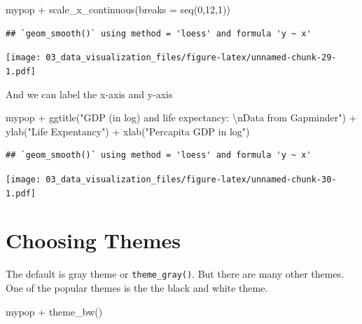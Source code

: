 \documentclass[
  10pt,
]{krantz}
\newenvironment{Shaded}{\begin{snugshade}}{\end{snugshade}}
\newcommand{\AttributeTok}[1]{\textcolor[rgb]{0.77,0.63,0.00}{#1}}
\newcommand{\DecValTok}[1]{\textcolor[rgb]{0.00,0.00,0.81}{#1}}
\newcommand{\FunctionTok}[1]{\textcolor[rgb]{0.00,0.00,0.00}{#1}}
\newcommand{\NormalTok}[1]{#1}
\newcommand{\SpecialCharTok}[1]{\textcolor[rgb]{0.00,0.00,0.00}{#1}}
\newcommand{\StringTok}[1]{\textcolor[rgb]{0.31,0.60,0.02}{#1}}
\begin{document}
\begin{Shaded}
\begin{Highlighting}[]
\NormalTok{mypop }\SpecialCharTok{+} 
  \FunctionTok{scale\_x\_continuous}\NormalTok{(}\AttributeTok{breaks =} \FunctionTok{seq}\NormalTok{(}\DecValTok{0}\NormalTok{,}\DecValTok{12}\NormalTok{,}\DecValTok{1}\NormalTok{))}
\end{Highlighting}
\end{Shaded}

\begin{verbatim}
## `geom_smooth()` using method = 'loess' and formula 'y ~ x'
\end{verbatim}

\texttt{[image: 03\_data\_visualization\_files/figure-latex/unnamed-chunk-29-1.pdf]}

And we can label the x-axis and y-axis

\begin{Shaded}
\begin{Highlighting}[]
\NormalTok{mypop }\SpecialCharTok{+} 
  \FunctionTok{ggtitle}\NormalTok{(}\StringTok{"GDP (in log) and life expectancy:}
\StringTok{                }\SpecialCharTok{\textbackslash{}n}\StringTok{Data from Gapminder"}\NormalTok{) }\SpecialCharTok{+} 
  \FunctionTok{ylab}\NormalTok{(}\StringTok{"Life Expentancy"}\NormalTok{) }\SpecialCharTok{+} 
  \FunctionTok{xlab}\NormalTok{(}\StringTok{"Percapita GDP in log"}\NormalTok{)}
\end{Highlighting}
\end{Shaded}

\begin{verbatim}
## `geom_smooth()` using method = 'loess' and formula 'y ~ x'
\end{verbatim}

\texttt{[image: 03\_data\_visualization\_files/figure-latex/unnamed-chunk-30-1.pdf]}

\hypertarget{choosing-themes}{%
\section{Choosing Themes}\label{choosing-themes}}

The default is gray theme or \texttt{theme\_gray()}. But there are many other themes. One of the popular themes is the the black and white theme.

\begin{Shaded}
\begin{Highlighting}[]
\NormalTok{mypop }\SpecialCharTok{+} 
  \FunctionTok{theme\_bw}\NormalTok{()}
\end{Highlighting}
\end{Shaded}
\end{document}
